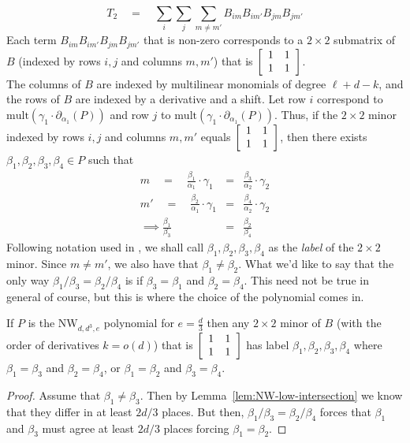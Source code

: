 \documentclass{beatcs}
\newcommand{\NW}{\mathrm{NW}}
\newcommand{\spaced}[1]{\quad#1\quad}
\begin{document}
\[
T_2 \spaced{=} \sum_i \sum_j \sum_{m\neq m'} B_{im}B_{im'}B_{jm}B_{jm'}
\]
Each term $B_{im}B_{im'}B_{jm}B_{jm'}$ that is non-zero corresponds to a $2\times 2$ submatrix of $B$ (indexed by rows $i,j$ and columns $m,m'$) that is $\left[\begin{array}{cc} 1 & 1\\ 1&1
  \end{array}\right]$. \\

The columns of $B$ are indexed by multilinear monomials of degree $\ell + d - k$, and the rows of $B$ are indexed by a derivative and a shift. Let row $i$ correspond to $\mathrm{mult}(\gamma_1 \cdot \partial_{\alpha_1}(P))$ and row $j$ to $\mathrm{mult}(\gamma_1 \cdot \partial_{\alpha_1}(P))$. Thus, if the $2\times 2$ minor indexed by rows $i,j$ and columns $m,m'$ equals $\left[\begin{array}{cc} 1 & 1\\ 1&1 \end{array}\right]$, then there exists $\beta_1, \beta_2,\beta_3,\beta_4 \in P$ such that
\begin{eqnarray*}
m \spaced{=} \frac{\beta_1}{\alpha_1}\cdot \gamma_1 & = & \frac{\beta_3}{\alpha_2} \cdot  \gamma_2\\
m' \spaced{=} \frac{\beta_2}{\alpha_1}\cdot \gamma_1 & = & \frac{\beta_4}{\alpha_2}\cdot \gamma_2\\
\implies \frac{\beta_1}{\beta_3} & = & \frac{\beta_2}{\beta_4}
\end{eqnarray*}
Following notation used in \cite{KLSS}, we shall call $\beta_1,\beta_2,\beta_3,\beta_4$ as the \emph{label} of the $2\times 2$ minor. 
Since $m\neq m'$, we also have that $\beta_1 \neq \beta_2$. What we'd like to say that the only way $\beta_1/\beta_3 = \beta_2/\beta_4$ is if $\beta_3 = \beta_1$ and $\beta_2 = \beta_4$. This need not be true in general of course, but this is where the choice of the polynomial comes in. 

\begin{claim}
If $P$ is the $\NW_{d,d^3, e}$ polynomial for $e = \frac{d}{3}$ then any $2\times 2$ minor of $B$ (with the order of derivatives $k = o(d)$) that is $\left[\begin{array}{cc} 1&1\\1&1\end{array}\right]$ has label $\beta_1,\beta_2,\beta_3,\beta_4$ where $\beta_1 = \beta_3$ and $\beta_2 = \beta_4$, or $\beta_1 = \beta_2$ and $\beta_3 = \beta_4$. 
\end{claim}
\begin{proof}
Assume that $\beta_1 \neq \beta_3$. Then by Lemma~\ref{lem:NW-low-intersection} we know that they differ in at least $2d/3$ places. But then, $\beta_1/\beta_3 = \beta_2/\beta_4$ forces that $\beta_1$ and $\beta_3$ must agree at least $2d/3$ places forcing $\beta_1 = \beta_2$. 
\end{proof}
\end{document}
